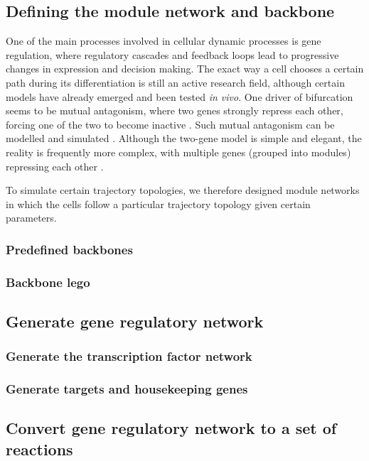 \subsection{Defining the module network and backbone}
One of the main processes involved in cellular dynamic processes is gene regulation, where regulatory cascades and feedback loops lead to progressive changes in expression and decision making. The exact way a cell chooses a certain path during its differentiation is still an active research field, although certain models have already emerged and been tested \textit{in vivo}. One driver of bifurcation seems to be mutual antagonism, where two genes \cite{xu_regulationbifurcatingcell_2015} strongly repress each other, forcing one of the two to become inactive \cite{graf_forcingcellschange_2009}. Such mutual antagonism can be modelled and simulated \cite{wang_quantifyingwaddingtonlandscape_2011, ferrell_bistabilitybifurcationswaddington_2012}. Although the two-gene model is simple and elegant, the reality is frequently more complex, with multiple genes (grouped into modules) repressing each other \cite{yosef_dynamicregulatorynetwork_2013}.

To simulate certain trajectory topologies, we therefore designed module networks in which the cells follow a particular trajectory topology given certain parameters.
\subsubsection{Predefined backbones}
\subsubsection{Backbone lego}

\subsection{Generate gene regulatory network}
\subsubsection{Generate the transcription factor network}
\subsubsection{Generate targets and housekeeping genes}

\subsection{Convert gene regulatory network to a set of reactions}

